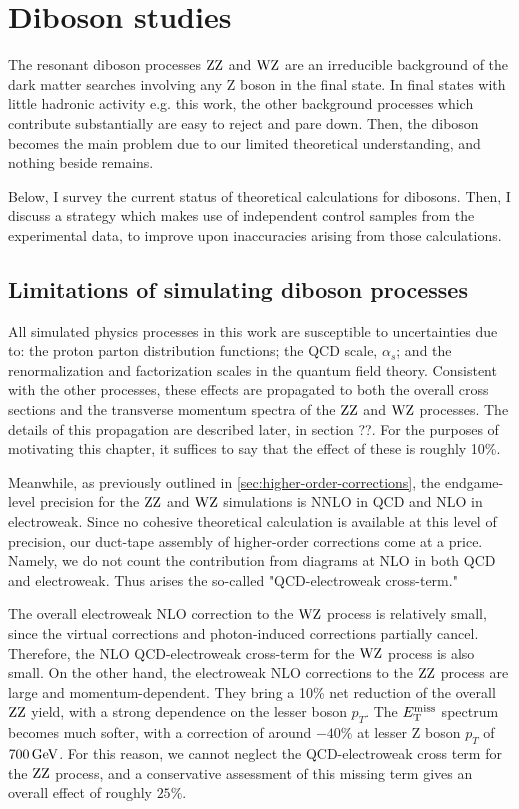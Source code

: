 \chapter{Diboson studies}
\label{chap:dibosons}

The resonant diboson processes $\mathrm{Z}\mathrm{Z}$ and $\mathrm{W}\mathrm{Z}$ are an irreducible background of the
dark matter searches involving any Z boson in the final state.
In final states with little hadronic activity e.g. this work, 
the other background processes which contribute substantially are easy to reject and pare down.
Then, the diboson becomes the main problem due to our limited theoretical understanding, and nothing beside remains.

Below, I survey the current status of theoretical calculations for dibosons. 
Then, I discuss a strategy which makes use of independent control samples from the experimental data,
to improve upon inaccuracies arising from those calculations.

\section{Limitations of simulating diboson processes}

All simulated physics processes in this work are susceptible to uncertainties due to: the proton parton distribution functions; the QCD scale, $\alpha_s$; and the renormalization and factorization scales in the quantum field theory.
Consistent with the other processes, these effects are propagated to both the overall cross sections and the transverse momentum spectra of the $\mathrm{Z}\mathrm{Z}$ and $\mathrm{W}\mathrm{Z}$ processes.
The details of this propagation are described later, in section ??.
For the purposes of motivating this chapter, it suffices to say that the effect of these is roughly 10\%. 

Meanwhile, as previously outlined in \ref{sec:higher-order-corrections}, the endgame-level precision for the $\mathrm{Z}\mathrm{Z}$ and $\mathrm{W}\mathrm{Z}$ simulations is NNLO in QCD and NLO in electroweak.
Since no cohesive theoretical calculation is available at this level of precision, our duct-tape assembly of higher-order corrections come at a price.
Namely, we do not count the contribution from diagrams at NLO in both QCD and electroweak. Thus arises the so-called "QCD-electroweak cross-term."

The overall electroweak NLO correction to the $\mathrm{W}\mathrm{Z}$ process is relatively small, since the virtual corrections and photon-induced corrections partially cancel.
Therefore, the NLO QCD-electroweak cross-term for the $\mathrm{W}\mathrm{Z}$ process is also small.
On the other hand, the electroweak NLO corrections to the $\mathrm{Z}\mathrm{Z}$ process are large and momentum-dependent.
They bring a 10\% net reduction of the overall $\mathrm{Z}\mathrm{Z}$ yield, with a strong dependence on the lesser boson $p_T$.
The $E_\mathrm{T}^{\mathrm{miss}}$ spectrum becomes much softer, with a correction of around $-40\%$ at lesser Z boson $p_T$ of $700 \,\text{Ge\hspace{-.08em}V}$.
For this reason, we cannot neglect the QCD-electroweak cross term for the $\mathrm{Z}\mathrm{Z}$ process, and a conservative
assessment of this missing term gives an overall effect of roughly $25\%$.

